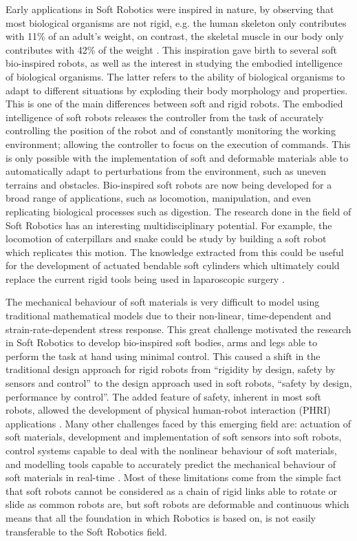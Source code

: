 Early applications in Soft Robotics were inspired in nature, by observing that most biological organisms are not rigid, e.g. the human skeleton only contributes with 11\% of an adult's weight, on contrast, the skeletal muscle in our body only contributes with 42\% of the weight \cite{kim2013soft}. This inspiration gave birth to several soft bio-inspired robots, as well as the interest in studying the embodied intelligence of biological organisms. The latter refers to the ability of biological organisms to adapt to different situations by exploding their body morphology and properties. This is one of the main differences between soft and rigid robots. The embodied intelligence of soft robots releases the controller from the task of accurately controlling the position of the robot and of constantly monitoring the working environment; allowing the controller to focus on the execution of commands. This is only possible with the implementation of soft and deformable materials able to automatically adapt to perturbations from the environment, such as uneven terrains and obstacles. Bio-inspired soft robots are now being developed for a broad range of applications, such as locomotion, manipulation, and even replicating biological processes such as digestion. The research done in the field of Soft Robotics has an interesting multidisciplinary potential. For example, the locomotion of caterpillars and snake could be study by building a soft robot which replicates this motion. The knowledge extracted from this could be useful for the development of actuated bendable soft cylinders which ultimately could replace the current rigid tools being used in laparoscopic surgery \cite{rus2015design}.

The mechanical behaviour of soft materials is very difficult to model using traditional mathematical models due to their non-linear, time-dependent and strain-rate-dependent stress response. This great challenge motivated the research in Soft Robotics to develop bio-inspired soft bodies, arms and legs able to perform the task at hand using minimal control. This caused a shift in the traditional design approach for rigid robots from ``rigidity by design, safety by sensors and control'' to the design approach used in soft robots, ``safety by design, performance by control''. The added feature of safety, inherent in most soft robots, allowed the development of physical human-robot interaction (PHRI) applications \cite{filippini2008toward}. Many other challenges faced by this emerging field are: actuation of soft materials, development and implementation of soft sensors into soft robots, control systems capable to deal with the nonlinear behaviour of soft materials, and modelling tools capable to accurately predict the mechanical behaviour of soft materials in real-time \cite{laschi2016soft,trivedi2008soft}. Most of these limitations come from the simple fact that soft robots cannot be considered as a chain of rigid links able to rotate or slide as common robots are, but soft robots are deformable and continuous which means that all the foundation in which Robotics is based on, is not easily transferable to the Soft Robotics field. 

